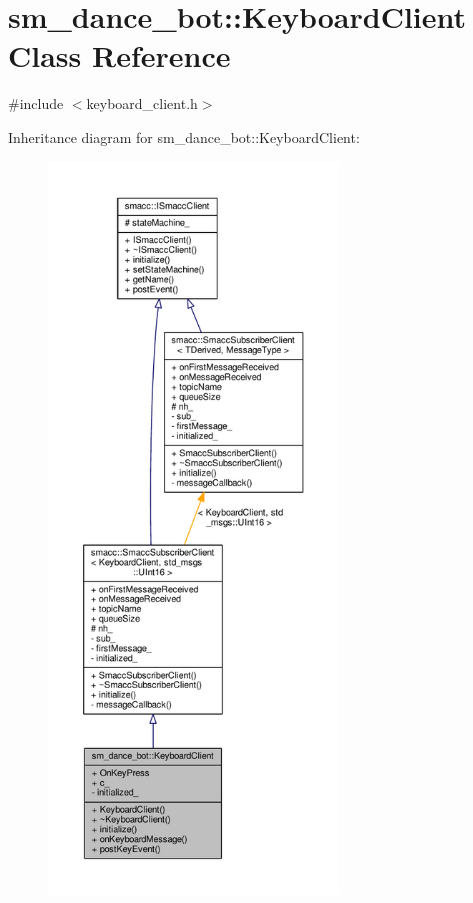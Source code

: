 \hypertarget{classsm__dance__bot_1_1KeyboardClient}{}\section{sm\+\_\+dance\+\_\+bot\+:\+:Keyboard\+Client Class Reference}
\label{classsm__dance__bot_1_1KeyboardClient}


{\ttfamily \#include $<$keyboard\+\_\+client.\+h$>$}



Inheritance diagram for sm\+\_\+dance\+\_\+bot\+:\+:Keyboard\+Client\+:
\nopagebreak
\begin{figure}[H]
\begin{center}
\leavevmode
\includegraphics[height=550pt]{classsm__dance__bot_1_1KeyboardClient__inherit__graph}
\end{center}
\end{figure}


